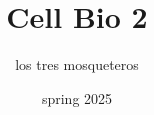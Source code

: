 \documentclass[10pt,a4paper]{article}
\begin{document}
	
	\begin{titlepage}
		\title{Cell Bio 2}
		\author{los tres mosqueteros}
		\date{spring 2025}
		\maketitle
	\end{titlepage}
	
	\setcounter{page}{1} 
	
	\newpage
	
	\tableofcontents
	
	\newpage
	
	\setcounter{page}{1} 
	
	
	
	\newpage
	\printglossaries
\end{document}

